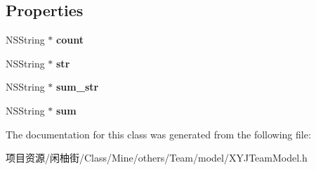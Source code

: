 \subsection*{Properties}
\begin{DoxyCompactItemize}
\item 
\mbox{\label{interface_x_y_j___t_m__left_a5ea5fa1ec9f9e201154512d29000e3e5}} 
N\+S\+String $\ast$ {\bfseries count}
\item 
\mbox{\label{interface_x_y_j___t_m__left_a35577f6fec90ff55846ca99aab761e68}} 
N\+S\+String $\ast$ {\bfseries str}
\item 
\mbox{\label{interface_x_y_j___t_m__left_a50445ccb937addb192e973ee7ffb6276}} 
N\+S\+String $\ast$ {\bfseries sum\+\_\+str}
\item 
\mbox{\label{interface_x_y_j___t_m__left_a1e78254a4b430befa1a7d39c92fe6379}} 
N\+S\+String $\ast$ {\bfseries sum}
\end{DoxyCompactItemize}


The documentation for this class was generated from the following file\+:\begin{DoxyCompactItemize}
\item 
项目资源/闲柚街/\+Class/\+Mine/others/\+Team/model/X\+Y\+J\+Team\+Model.\+h\end{DoxyCompactItemize}
